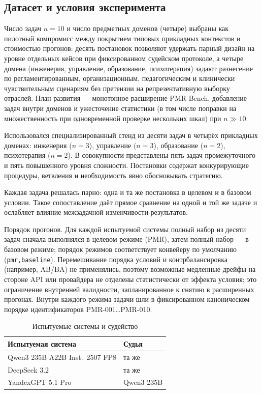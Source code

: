 \documentclass[a4paper,12pt]{article}
\begin{document}
\subsection{Датасет и условия эксперимента}

Число задач $n=10$ и число предметных доменов (четыре) выбраны как пилотный компромисс между покрытием типовых прикладных контекстов и стоимостью прогонов: десять постановок позволяют удержать парный дизайн на уровне отдельных кейсов при фиксированном судейском протоколе, а четыре домена (инженерия, управление, образование, психотерапия) задают разнесение по регламентированным, организационным, педагогическим и клинически чувствительным сценариям без претензии на репрезентативную выборку отраслей. План развития --- монотонное расширение PMR-Bench, добавление задач внутри доменов и ужесточение статистики (в том числе поправки на множественность при одновременной проверке нескольких шкал) при $n\gg 10$.

Использовался специализированный стенд из десяти задач в четырёх прикладных доменах: инженерия ($n=3$), управление ($n=3$), образование ($n=2$), психотерапия ($n=2$). В совокупности представлены пять задач промежуточного и пять повышенного уровня сложности. Постановки содержат конкурирующие процедуры, ветвления и необходимость явно обосновывать стратегию.

Каждая задача решалась парно: одна и та же постановка в целевом и в базовом условии. Такое сопоставление даёт прямое сравнение на одной и той же задаче и ослабляет влияние межзадачной изменчивости результатов.

Порядок прогонов. Для каждой испытуемой системы полный набор из десяти задач сначала выполнялся в целевом режиме (PMR), затем полный набор --- в базовом режиме; порядок режимов соответствует конвейеру по умолчанию (\texttt{pmr,baseline}). Перемешивание порядка условий и контрбалансировка (например, AB/BA) не применялись, поэтому возможные медленные дрейфы на стороне API или провайдера не отделены статистически от эффекта условия; это ограничение внутренней валидности, запланированное к снятию в расширенных прогонах. Внутри каждого режима задачи шли в фиксированном каноническом порядке идентификаторов PMR-001\dots PMR-010.

\begin{table}[htbp]
  \centering
  \caption{Испытуемые системы и судейство}
  \begin{tabular}{p{7.2cm}p{7.2cm}}
    \toprule
    Испытуемая система & Судья \\
    \midrule
    Qwen3 235B A22B Inst.~2507 FP8 & та же \\
    DeepSeek 3.2 & та же \\
    YandexGPT 5.1 Pro & Qwen3 235B \\
    \bottomrule
  \end{tabular}
\end{table}
\end{document}
